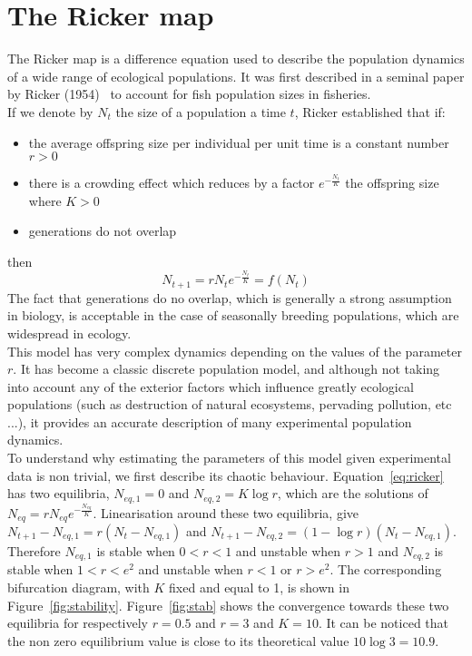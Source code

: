 \documentclass{report}
\begin{document}
	\section*{The Ricker map}
	The Ricker map is a difference equation used to describe the population dynamics of a wide range of ecological populations. It was first described in a seminal paper by Ricker (1954)~\cite{Ricker1954} to account for fish population sizes in fisheries. \\
	If we denote by $N_t$ the size of a population a time $t$, Ricker established that if:
	\begin{itemize}
		\item the average offspring size per individual per unit time is a constant number $r > 0$
		\item there is a crowding effect which reduces by a factor $e^{-\frac{N_t}{K}}$ the offspring size where $K > 0$
		\item generations do not overlap
	\end{itemize}
	then 
	\begin{equation}
		N_{t+1} = r N_t e^{-\frac{N_t}{K}} = f(N_t)
		\label{eq:ricker}
	\end{equation}
	The fact that generations do no overlap, which is generally a strong assumption in biology, is acceptable in the case of seasonally breeding populations, which are widespread in ecology. \\
	This model has very complex dynamics depending on the values of the parameter $r$. It has become a classic discrete population model, and although not taking into account any of the exterior factors which influence greatly ecological populations (such as destruction of natural ecosystems, pervading pollution, etc ...), it provides an accurate description of many experimental population dynamics. \\
	To understand why estimating the parameters of this model given experimental data is non trivial, we first describe its chaotic behaviour. Equation~\ref{eq:ricker} has two equilibria, $N_{eq, 1} = 0$ and $N_{eq, 2} = K\log r$, which are the solutions of  $N_{eq} = r N_{eq} e^{-\frac{N_{eq}}{K}}$. Linearisation around these two equilibria, give $N_{t+1} - N_{eq, 1} = r(N_{t} - N_{eq, 1})$ and $N_{t+1} - N_{eq, 2} = (1-\log r)(N_{t} - N_{eq, 1})$. Therefore $N_{eq, 1}$ is stable when $0 < r < 1$ and unstable when $r > 1$ and $N_{eq, 2}$ is stable when $1 < r < e^2$ and unstable when $r < 1$ or $r > e^2$. The corresponding bifurcation diagram, with $K$ fixed and equal to 1, is shown in Figure~\ref{fig:stability}. Figure~\ref{fig:stab} shows the convergence towards these two equilibria for respectively $r=0.5$ and $r=3$ and $K=10$. It can be noticed that the non zero equilibrium value is close to its theoretical value $10 \log 3 = 10.9$. \\
	
\end{document}
